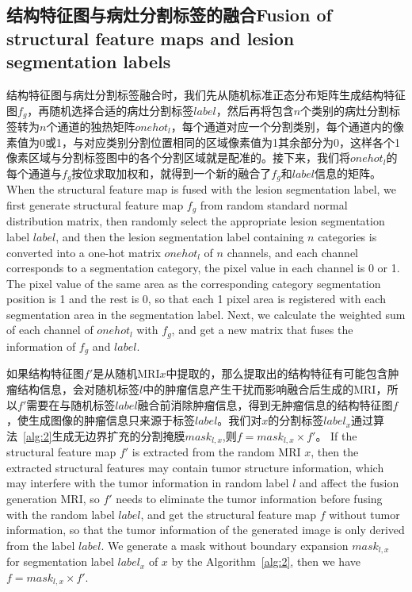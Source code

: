 \documentclass[letterpaper]{article} %
\begin{document}
\subsection{结构特征图与病灶分割标签的融合Fusion of structural feature maps and lesion segmentation labels}

结构特征图与病灶分割标签融合时，我们先从随机标准正态分布矩阵生成结构特征图$f_g$，再随机选择合适的病灶分割标签$label$，然后再将包含$n$个类别的病灶分割标签转为$n$个通道的独热矩阵$onehot_l$，每个通道对应一个分割类别，每个通道内的像素值为0或1，与对应类别分割位置相同的区域像素值为1其余部分为0，这样各个1像素区域与分割标签图中的各个分割区域就是配准的。接下来，我们将$onehot_l$的每个通道与$f_g$按位求取加权和，就得到一个新的融合了$f_g$和$label$信息的矩阵。
When the structural feature map is fused with the lesion segmentation label, we first generate structural feature map $f_g$ from random standard normal distribution matrix, then randomly select the appropriate lesion segmentation label $label$, and then the lesion segmentation label containing $n$ categories is converted into a one-hot matrix $onehot_l$ of $n$ channels, and each channel corresponds to a segmentation category, the pixel value in each channel is 0 or 1. The pixel value of the same area as the corresponding category segmentation position is 1 and the rest is 0, so that each 1 pixel area is registered with each segmentation area in the segmentation label. Next, we calculate the weighted sum of each channel of $onehot_l$ with $f_g$, and get a new matrix that fuses the information of $f_g$ and $label$.

如果结构特征图$f'$是从随机MRI$x$中提取的，那么提取出的结构特征有可能包含肿瘤结构信息，会对随机标签$l$中的肿瘤信息产生干扰而影响融合后生成的MRI，所以$f'$需要在与随机标签$label$融合前消除肿瘤信息，得到无肿瘤信息的结构特征图$f$，使生成图像的肿瘤信息只来源于标签$label$。我们对$x$的分割标签$label_x$通过算法~\ref{alg:2}生成无边界扩充的分割掩膜$mask_{l,x}$,则$f=mask_{l,x}\times f'$。
If the structural feature map $f'$ is extracted from the random MRI $x$, then the extracted structural features may contain tumor structure information, which may interfere with the tumor information in random label $l$ and affect the fusion generation MRI, so $f'$ needs to eliminate the tumor information before fusing with the random label $label$, and get the structural feature map $f$ without tumor information, so that the tumor information of the generated image is only derived from the label $label$. We generate a  mask without boundary expansion $mask_{l,x}$ for segmentation label $label_x$ of $x$ by the Algorithm~\ref{alg:2}, then we have $f=mask_{l,x}\times f'$.
\end{document}
